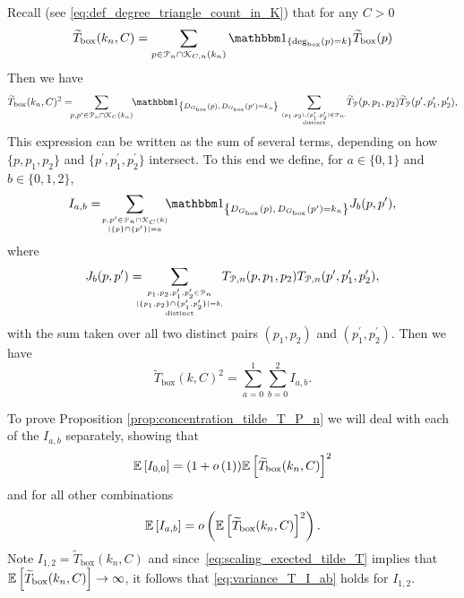Recall (see \eqref{eq:def_degree_triangle_count_in_K}) that for any $C > 0$
\[
	\widetilde{T}_{\text{box}}(k_n,C) = \sum_{p \in \Pcal_n \cap \Kcal_{C,n}(k_n)} \ind{\text{deg}_{\text{box}}(p) = k} \widetilde{T}_{\text{box}}(p)
\]
Then we have
\[
	\widetilde{T}_{\text{box}}(k_n,C)^2 = \hspace{-5pt} \sum_{p, p^\prime \in \Pcal_n \cap \Kcal_C(k_n)}
		\hspace{-3pt} \ind{\Dbox(p), \, \Dbox(p^\prime) = k_n} 
		\sum_{(p_1, p_2), (p_1^\prime, p_2^\prime) \in \Pcal_n, \atop \text{distinct}} \hspace{-3pt}
		\widetilde{T}_{\Pcal}(p,p_1,p_2) \widetilde{T}_{\Pcal}(p^\prime, p_1^\prime, p_2^\prime),
\]
This expression can be written as the sum of several terms, depending on how $\{p, p_1, p_2\}$ and $\{p^\prime, p_1^\prime, p_2^\prime\}$ intersect. To this end we define, for $a \in \{0,1\}$ and $b \in \{0,1,2\}$,
\[
	I_{a,b} = \hspace{-3pt} \sum_{p, p^\prime \in \Pcal_n \cap \Kcal_C(k) \atop |\{p\} \cap \{p^\prime\}| = a}
	\hspace{-5pt} \ind{\Dbox(p), \, \Dbox(p^\prime) = k_n} J_b(p,p^\prime),
\]
where
\[
	J_b(p,p^\prime) = \hspace{-10pt} \sum_{{p_1, p_2, p_1^\prime, p_2^\prime \in \Pcal_n 
		\atop |\{p_1, p_2\} \cap \{p_1^\prime, p_2^\prime\}| = b,} \atop \text{distinct}}
		\hspace{-5pt} T_{\Pcal,n}(p,p_1,p_2) T_{\Pcal,n}(p^\prime, p_1^\prime, p_2^\prime),
\]
with the sum taken over all two distinct pairs $(p_1, p_2)$ and $(p_1^\prime, p_2^\prime)$. Then we have
\[
	\widetilde{T}_{\text{box}}(k, C)^2 = \sum_{a = 0}^1 \sum_{b = 0}^2 I_{a,b}.
\]

To prove Proposition \ref{prop:concentration_tilde_T_P_n} we will deal with each of the $I_{a,b}$ separately, showing that 
\begin{equation}\label{eq:variance_T_I_00}
	\mathbb{E}\left[I_{0,0}\right] = (1+o\left(1\right))\mathbb{E}\left[\widetilde{T}_{\text{box}}(k_n,C)\right]^2
\end{equation}
and for all other combinations
\begin{equation}\label{eq:variance_T_I_ab}
	\mathbb{E}\left[I_{a,b}\right] = o\left(\mathbb{E}\left[\widetilde{T}_{\text{box}}(k_n,C)\right]^2\right).
\end{equation}
Note $I_{1,2} = \widetilde{T}_{\text{box}}(k_n,C)$ and since~\eqref{eq:scaling_exected_tilde_T} implies that $\mathbb{E}\left[\widetilde{T}_{\text{box}}(k_n,C)\right] \to \infty$, it follows that \eqref{eq:variance_T_I_ab} holds for $I_{1,2}$. 

